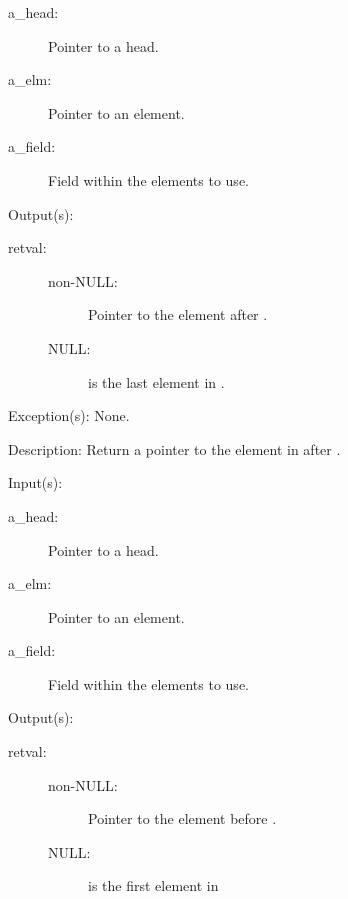 \begin{capi}
\begin{capilist}
\begin{description}
		\item[a\_head: ]
			Pointer to a  head.
		\item[a\_elm: ]
			Pointer to an element.
		\item[a\_field: ]
			Field within the  elements to use.
		\end{description}
	\item[Output(s): ]
		\begin{description}\item[]
		\item[retval: ]
			\begin{description}\item[]
			\item[non-NULL: ]
				Pointer to the element after .
			\item[NULL: ]
				 is the last element in
				.
			\end{description}
		\end{description}
	\item[Exception(s): ] None.
	\item[Description: ]
		Return a pointer to the element in  after
		.
	\end{capilist}
\label{ql_prev}
	\begin{capilist}
	\item[Input(s): ]
		\begin{description}\item[]
		\item[a\_head: ]
			Pointer to a  head.
		\item[a\_elm: ]
			Pointer to an element.
		\item[a\_field: ]
			Field within the  elements to use.
		\end{description}
	\item[Output(s): ]
		\begin{description}\item[]
		\item[retval: ]
			\begin{description}\item[]
			\item[non-NULL: ]
				Pointer to the element before .
			\item[NULL: ]
				 is the first element in

\end{description}
\end{description}
\end{capilist}
\end{capi}
